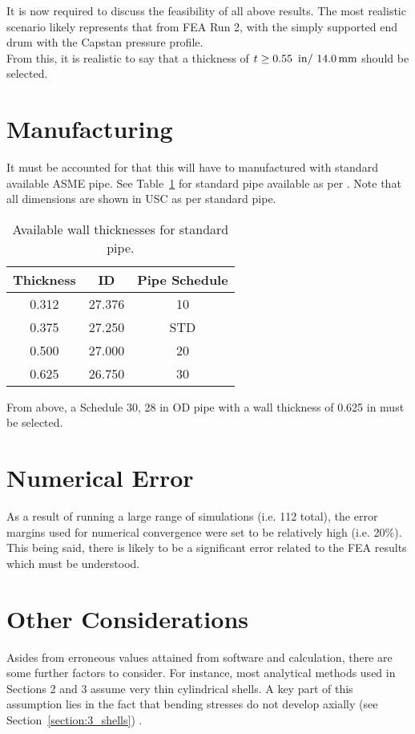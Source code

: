It is now required to discuss the feasibility of all above results. The most realistic scenario likely represents that from FEA Run 2, with the simply supported end drum with the Capstan pressure profile.\\

From this, it is realistic to say that a thickness of $t\geq 0.55\ \,\mathrm{in}/ \ 14.0\,\mathrm{mm}$ should be selected. 

\section{Manufacturing}

It must be accounted for that this will have to manufactured with standard available ASME pipe. See Table~\ref{table:5_pipe} for standard pipe available as per \cite{PIPEINFO}. Note that all dimensions are shown in USC as per standard pipe.

\begin{table}[H]
	\caption[Available wall thicknesses for standard pipe.]{Available wall thicknesses for standard pipe.\protect\cite{PIPEINFO}}
	\centering
	\begin{tabular}{ccc}
    \textbf{Thickness} & \textbf{ID} & \textbf{Pipe Schedule} \\
    \midrule
    0.312 & 27.376 & 10 \\
    0.375 & 27.250 & STD \\
    0.500 & 27.000 & 20 \\
    0.625 & 26.750 & 30 \\
    \end{tabular}%
	\label{table:5_pipe}
\end{table}

From above, a Schedule 30, 28 in OD pipe with a wall thickness of 0.625 in must be selected.

\section{Numerical Error}
As a result of running a large range of \cite{ANSYS} simulations (i.e. 112 total), the error margins used for numerical convergence were set to be relatively high (i.e. 20\%). This being said, there is likely to be a significant error related to the FEA results which must be understood.


\section{Other Considerations}
Asides from erroneous values attained from software and calculation, there are some further factors to consider. For instance, most analytical methods used in Sections 2 and 3 assume very thin cylindrical shells. A key part of this assumption lies in the fact that bending stresses do not develop axially (see Section~\ref{section:3_shells}) \cite{timoshenko1959theory}. \\

